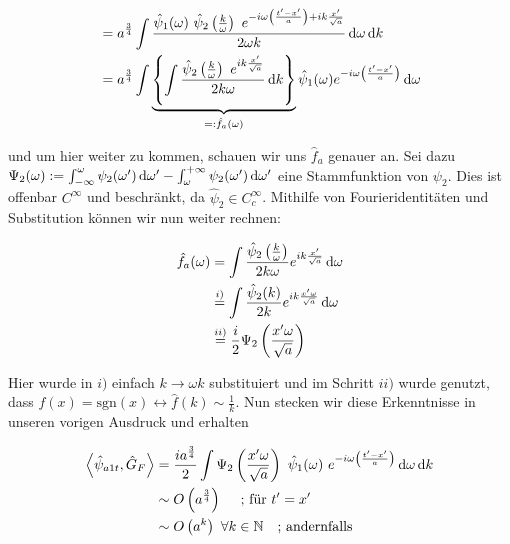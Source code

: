 \documentclass{scrartcl}
\begin{document}
\begin{align}
    &=
    a^\frac{3}{4} \int \frac{
    \hat \psi_1(\omega)
    ~\hat\psi_2 \left(\frac{k}{\omega}\right)
    ~ e^{-i \omega \left(\frac{t'-x'}{a}\right) + i k \frac{x'}{\sqrt{a}}}
    }
    {
    2\omega k
    } \mathop{}\!\mathrm{d} \omega \mathop{}\!\mathrm{d} k \nonumber \\
    &= a^\frac{3}{4} \int
    \underbrace{\left\{ \int \frac{\hat \psi_2\left(\frac{k}{\omega}\right)
        ~e^{ik\frac{x'}{\sqrt{a}}}
        }
        {
            2 k \omega
        }
        \mathop{}\!\mathrm{d} k
        \right\}}_{=: \hat f_a (\omega)}
    \hat \psi_1(\omega) e^{-i \omega \left(\frac{t'-x'}{a}\right)}
    \mathop{}\!\mathrm{d} \omega
\end{align}

und um hier weiter zu kommen, schauen wir uns $\hat f_a$ genauer an. Sei dazu
$\Psi_2(\omega) := \int_{-\infty}^\omega \psi_2(\omega ') \mathop{}\!\mathrm{d} \omega '
    -  \int_{\omega}^{+ \infty} \psi_2(\omega ') \mathop{}\!\mathrm{d} \omega '$ eine
Stammfunktion von $\psi_2$. Dies ist offenbar $C^\infty$ und beschränkt, da
 $\hat \psi_2 \in C^\infty_c$. Mithilfe von Fourieridentitäten und Substitution können wir nun weiter rechnen:

\begin{align*}
    \hat f_a (\omega) &=
    \int \frac{\hat \psi_2\left(\frac{k}{\omega}\right)}{2k\omega}
    e^{i k \frac{x'}{\sqrt{a}}}
    \mathop{}\!\mathrm{d} \omega \\
    &\stackrel{i)}{=}
    \int \frac{\hat \psi_2 (k)}{2k}e^{ik\frac{x' \omega}{\sqrt{a}}}
    \mathop{}\!\mathrm{d} \omega \\
    &\stackrel{ii)}{=} \frac{i}{2}  \Psi_2\left(\frac{x' \omega}{\sqrt{a}}\right)
\end{align*}

Hier wurde in $i)$ einfach $k \rightarrow \omega k$ substituiert und im Schritt $ii)$
wurde genutzt, dass $f(x) = \mathrm{sgn}(x) \leftrightarrow \hat f(k) \sim \frac{1}{k}$.
Nun stecken wir diese Erkenntnisse in unseren vorigen Ausdruck und erhalten

\begin{align}
 \left< \hat\psi_{a1t}, \hat G_F \right>
    &=
    \frac{i a^\frac{3}{4}}{2} \int \Psi_2\left(\frac{x' \omega}{\sqrt{a}}\right)
    ~\hat \psi_1(\omega)
    ~ e^{-i \omega \left(\frac{t'-x'}{a}\right)}
    \mathop{}\!\mathrm{d} \omega \mathop{}\!\mathrm{d} k
    \nonumber \\
    &\sim O\left(a^\frac{3}{4}\right) \kern 1em \textrm{ ; für } t'=x'
    \nonumber \\
    &\sim O\left(a^k\right) ~ \forall k \in \mathbb{N} \kern 1em \textrm{;   andernfalls}
\end{align}
\end{document}
